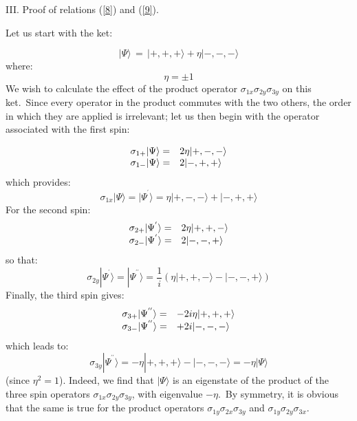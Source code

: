 \documentclass[12pt,onecolumn]{article}%
\begin{document}
\bigskip

\begin{center}
III. Proof of relations (\ref{8}) and (\ref{9}).
\end{center}

Let us start with the ket:%

\begin{equation}
|\Psi\rangle \,=\,|+,+,+\rangle +\eta|-,-,-\rangle  \label{a1}%
\end{equation}
where:
\begin{equation}
\eta=\pm1 \label{a2}%
\end{equation}
We wish to calculate the effect of the product operator $\sigma_{1x}%
\sigma_{2y}\sigma_{3y}$ on this ket.\ Since every operator in the product
commutes with the two others, the order in which they are applied is
irrelevant; let us then begin with the operator associated with the first spin:%

\begin{equation}%
\begin{array}
[c]{ll}%
\sigma_{1+}|\Psi\rangle = & 2\eta|+,-,-\rangle \\
\sigma_{1-}|\Psi\rangle = & 2|-,+,+\rangle 
\end{array}
\label{a3}%
\end{equation}
which provides:
\begin{equation}
\sigma_{1x}|\Psi\rangle =|\Psi^{^{\prime}}\rangle =\eta|+,-,-\rangle +|-,+,+\rangle 
\label{a4}%
\end{equation}
For the second spin:
\begin{equation}%
\begin{array}
[c]{ll}%
\sigma_{2+}|\Psi^{^{\prime}}\rangle = & 2\eta|+,+,-\rangle \\
\sigma_{2-}|\Psi^{^{\prime}}\rangle = & 2|-,-,+\rangle 
\end{array}
\label{a5}%
\end{equation}
so that:
\begin{equation}
\sigma_{2y}|\Psi^{^{\prime}}\rangle =|\Psi^{^{\prime\prime}}\rangle = \frac{1}%
{i}\left(  \eta|+,+,-\rangle -|-,-,+\rangle \right)  \label{a6}%
\end{equation}
Finally, the third spin gives:
\begin{equation}%
\begin{array}
[c]{ll}%
\sigma_{3+}|\Psi^{^{\prime\prime}}\rangle =  & -2i\eta|+,+,+\rangle \\
\sigma_{3-}|\Psi^{^{\prime\prime}}\rangle =  & +2i|-,-,-\rangle 
\end{array}
\label{a7}%
\end{equation}
which leads to:
\begin{equation}
\sigma_{3y}|\Psi^{^{\prime\prime}}\rangle = -\eta|+,+,+\rangle -|-,-,-\rangle =-\eta
|\Psi\rangle  \label{a8}%
\end{equation}
(since $\eta^{2}=1$). Indeed, we find that $|\Psi\rangle $ is an eigenstate of the
product of the three spin operators $\sigma_{1x}\sigma_{2y}\sigma_{3y}$, with
eigenvalue $-\eta$.\ By symmetry, it is obvious that the same is true for the
product operators $\sigma_{1y}\sigma_{2x}\sigma_{3y}$ and $\sigma_{1y}%
\sigma_{2y}\sigma_{3x}$.
\end{document}
